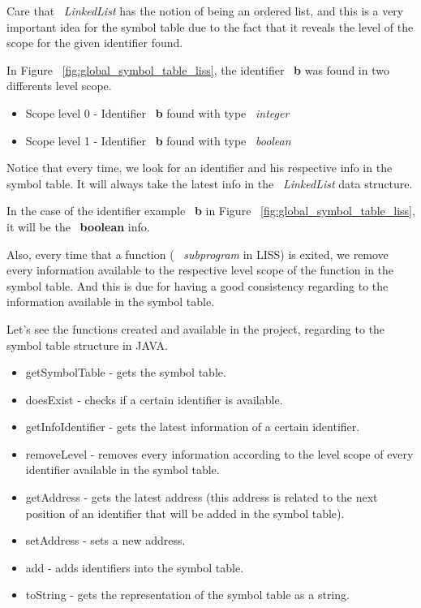 \documentclass[
  oneside,
  11pt, a4paper,
  footinclude=true,
  headinclude=true,
  cleardoublepage=empty
]{scrbook}
\begin{document}
Care that ~\textit{LinkedList} has the notion of being an ordered list, and this is a very important idea for the symbol table due to the fact that it reveals the level of the scope for the given identifier found.

In Figure ~\ref{fig:global_symbol_table_liss}, the identifier ~\textbf{b} was found in two differents level scope.
\begin{itemize}
\item Scope level 0 - Identifier ~\textbf{b} found with type ~\textit{integer}
\item Scope level 1 - Identifier ~\textbf{b} found with type ~\textit{boolean}
\end{itemize}

Notice that every time, we look for an identifier and his respective info in the symbol table. It will always take the latest info in the ~\textit{LinkedList} data structure. 

In the case of the identifier example ~\textbf{b} in Figure ~\ref{fig:global_symbol_table_liss}, it will be the ~\textbf{boolean} info.



Also, every time that a function ( ~\textit{subprogram} in LISS) is exited, we remove every information  available to the respective level scope of the function in the symbol table. And this is due for having a good consistency regarding to the information available in the symbol table.

Let's see the functions created and available in the project, regarding to the symbol table structure in JAVA.

\begin{itemize}
\item getSymbolTable - gets the symbol table.
\item doesExist - checks if a certain identifier is available.
\item getInfoIdentifier - gets the latest information of a certain identifier.
\item removeLevel - removes every information according to the level scope of every identifier available in the symbol table.
\item getAddress - gets the latest address (this address is related to the next position of an identifier that will be added in the symbol table).
\item setAddress - sets a new address.
\item add - adds identifiers into the symbol table.
\item toString - gets the representation of the symbol table as a string.
\end{itemize}
\end{document}
